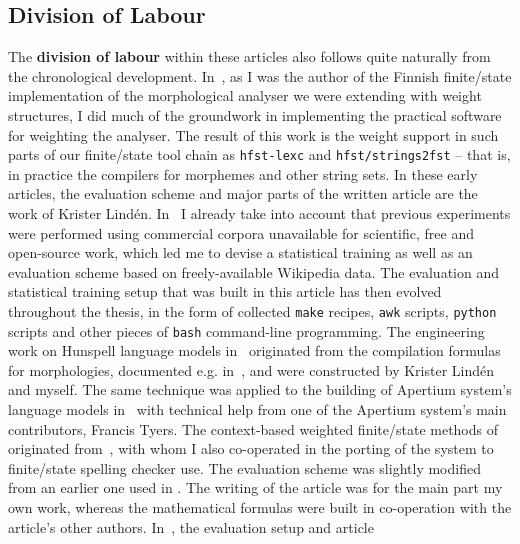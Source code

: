 \documentclass[officiallayout,final]{unihelcompling}
\begin{document}
\subsection{Division of Labour}
\label{subsec:division-of-labour}

The \textbf{division of labour} within these articles also follows quite
naturally from the chronological development.
In~, as I was the author
of the Finnish finite\-/state implementation of the morphological analyser we
were extending with weight structures, I did much of the groundwork in
implementing the practical software for weighting the analyser. The result of
this work is the weight support in such parts of our finite\-/state tool chain
as \texttt{hfst-lexc} and \texttt{hfst\-/strings2fst} -- that is, in practice
the compilers for morphemes and other string sets. In these early articles, the
evaluation scheme and major parts of the written article are the work of
Krister Lindén.  In~ I already take into
account that previous experiments were performed using commercial corpora
unavailable for scientific, free and open-source work, which led me to devise a
statistical training as well as an evaluation scheme based on freely-available
Wikipedia data. The evaluation and statistical training setup that was built in
this article has then evolved throughout the thesis, in the form of collected
\texttt{make} recipes, \texttt{awk} scripts, \texttt{python} scripts and other
pieces of \texttt{bash} command-line programming. The engineering work on
Hunspell language models
in~ originated from the
compilation formulas for morphologies, documented e.g.\/
in~\cite{linden2009hfst}, and were constructed by Krister Lindén and myself.
The same technique was applied to the building of  Apertium system's language
models in~ with technical help from one of the
Apertium system's main contributors, Francis Tyers.  The context-based weighted
finite\-/state methods of  originated
from~\citet{silfverberg2010partofspeech}, with whom I also co-operated in the
porting of the system to finite\-/state spelling checker use. The evaluation
scheme was slightly modified from an earlier one used in
. The writing of the article
 was for the main part  my own work, whereas
the mathematical formulas were built in co-operation with the article's other
authors.  In~, the evaluation setup and article
\end{document}
